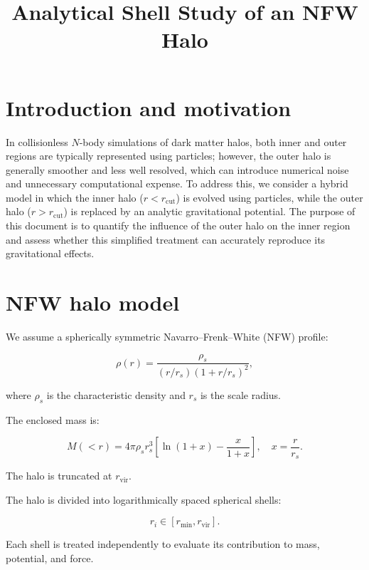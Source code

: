 \documentclass[11pt,a4paper]{article}
\title{\textbf{Analytical Shell Study of an NFW Halo}}
\date{}
\begin{document}
\maketitle

\section{Introduction and motivation}
In collisionless $N$-body simulations of dark matter halos, both inner and outer regions are typically represented using particles; however, the outer halo is generally smoother and less well resolved, which can introduce numerical noise and unnecessary computational expense. To address this, we consider a hybrid model in which the inner halo ($r < r_{\mathrm{cut}}$) is evolved using particles, while the outer halo ($r > r_{\mathrm{cut}}$) is replaced by an analytic gravitational potential. The purpose of this document is to quantify the influence of the outer halo on the inner region and assess whether this simplified treatment can accurately reproduce its gravitational effects.

\section{NFW halo model}

We assume a spherically symmetric Navarro--Frenk--White (NFW) profile:

\begin{equation}
\rho(r) = \frac{\rho_s}{(r/r_s)(1 + r/r_s)^2},
\end{equation}

where $\rho_s$ is the characteristic density and $r_s$ is the scale radius.

The enclosed mass is:

\begin{equation}
M(<r) = 4\pi \rho_s r_s^3 \left[ \ln(1+x) - \frac{x}{1+x} \right], \quad x = \frac{r}{r_s}.
\end{equation}

The halo is truncated at $r_{\mathrm{vir}}$.

The halo is divided into logarithmically spaced spherical shells:

\begin{equation}
r_i \in [r_{\mathrm{min}}, r_{\mathrm{vir}}].
\end{equation}

Each shell is treated independently to evaluate its contribution to mass, potential, and force.
\end{document}
